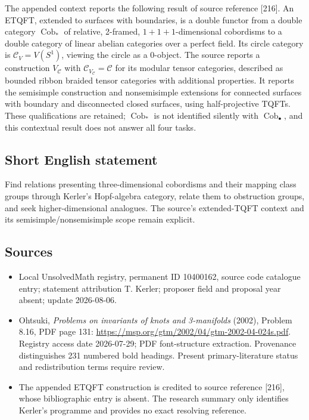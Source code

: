 \documentclass[11pt]{article}
\begin{document}
The appended context reports the following result of source reference [216]. An ETQFT, extended to surfaces with boundaries, is a double functor from a double category \(\operatorname{Cob}_*\) of relative, 2-framed, \(1+1+1\)-dimensional cobordisms to a double category of linear abelian categories over a perfect field. Its circle category is \(\mathcal C_V=V(S^1)\), viewing the circle as a 0-object. The source reports a construction \(V_{\mathcal C}\) with \(\mathcal C_{V_{\mathcal C}}=\mathcal C\) for its modular tensor categories, described as bounded ribbon braided tensor categories with additional properties. It reports the semisimple construction and nonsemisimple extensions for connected surfaces with boundary and disconnected closed surfaces, using half-projective TQFTs. These qualifications are retained; \(\operatorname{Cob}_*\) is not identified silently with \(\operatorname{Cob}_\bullet\), and this contextual result does not answer all four tasks.
\subsection{Short English statement}
Find relations presenting three-dimensional cobordisms and their mapping class groups through Kerler's Hopf-algebra category, relate them to obstruction groups, and seek higher-dimensional analogues. The source's extended-TQFT context and its semisimple/nonsemisimple scope remain explicit.
\subsection{Sources}
\begin{itemize}
\item Local UnsolvedMath registry, permanent ID 10400162, source code catalogue entry; statement attribution T. Kerler; proposer field and proposal year absent; update 2026-08-06.
\item Ohtsuki, \emph{Problems on invariants of knots and 3-manifolds} (2002), Problem 8.16, PDF page 131: \url{https://msp.org/gtm/2002/04/gtm-2002-04-024s.pdf}. Registry access date 2026-07-29; PDF font-structure extraction. Provenance distinguishes 231 numbered bold headings. Present primary-literature status and redistribution terms require review.
\item The appended ETQFT construction is credited to source reference [216], whose bibliographic entry is absent. The research summary only identifies Kerler's programme and provides no exact resolving reference.
\end{itemize}
\end{document}
